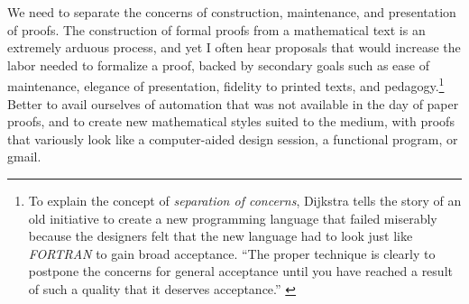 \documentclass{llncs}
\begin{document}
We need to separate the concerns of construction, maintenance, and
presentation of proofs.  The construction of formal proofs from a
mathematical text is an extremely arduous process, and yet I often
hear proposals that would increase the labor needed to formalize a
proof, backed by secondary goals such as ease of maintenance, elegance
of presentation, fidelity to printed texts, and pedagogy.\footnote{%
  To explain the concept of {\it separation of concerns}, Dijkstra
  tells the story of an old initiative to create a new programming
  language that failed miserably because the designers felt that the
  new language had to look just like {\it FORTRAN} to gain broad
  acceptance. ``The proper technique is clearly to postpone the
  concerns for general acceptance until you have reached a result of
  such a quality that it deserves acceptance.''
  \cite{DijkST}} %
Better to avail ourselves of automation that was not available in the
day of paper proofs, and to create new mathematical styles suited to
the medium, with proofs that variously look like a
%
computer-aided design session, a functional program, or gmail.
%
%
\end{document}
